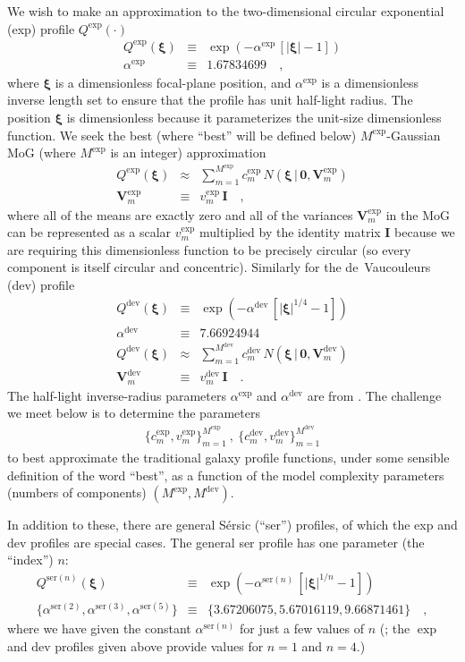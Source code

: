 \documentclass[12pt,pdftex,preprint]{aastex}
\newcommand{\tmatrix}[1]{\boldsymbol{#1}}
\newcommand{\tvector}[1]{\boldsymbol{#1}}
\newcommand{\spos}{\tvector{\xi}}
\newcommand{\var}{\tmatrix{V}}
\newcommand{\zero}{\tmatrix{0}}
\newcommand{\identity}{\tmatrix{I}}
\newcommand{\normal}{N}
\newcommand{\given}{\,|\,}
\newcommand{\dev}{\mathrm{dev}}
\newcommand{\ser}{\mathrm{ser}}
\begin{document}
We wish to make an approximation to the two-dimensional circular
exponential (exp) profile $Q^{\exp}(\cdot)$
\begin{eqnarray}\displaystyle
Q^{\exp}(\spos) &\equiv& \exp(-\alpha^{\exp}\,[|\spos| - 1])
\\
\alpha^{\exp} &\equiv& 1.67834699
\quad ,
\end{eqnarray}
where $\spos$ is a dimensionless focal-plane position, and
$\alpha^{\exp}$ is a dimensionless inverse length set to ensure that
the profile has unit half-light radius.  The position $\spos$ is
dimensionless because it parameterizes the unit-size dimensionless
function.  We seek the best (where ``best'' will be defined below)
$M^{\exp}$-Gaussian MoG (where $M^{\exp}$ is an integer) approximation
\begin{eqnarray}\displaystyle
Q^{\exp}(\spos) &\approx& \sum_{m=1}^{M^{\exp}} c^{\exp}_m\,\normal(\spos\given\zero,\var^{\exp}_m)
\\
\var^{\exp}_m &\equiv& v^{\exp}_m\,\identity
\quad ,
\end{eqnarray}
where all of the means are exactly zero and all of the variances
$\var^{\exp}_m$ in the MoG can be represented as a scalar
$v^{\exp}_m$ multiplied by the identity matrix $\identity$
because we are requiring this dimensionless function to be precisely
circular (so every component is itself circular and concentric).
Similarly for the de~Vaucouleurs (dev) profile
\begin{eqnarray}\displaystyle
Q^{\dev}(\spos) &\equiv& \exp(-\alpha^{\dev}\,[|\spos|^{1/4} - 1])
\\
\alpha^{\dev} &\equiv& 7.66924944
\\
Q^{\dev}(\spos) &\approx& \sum_{m=1}^{M^{\dev}} c^{\dev}_m\,\normal(\spos\given\zero,\var^{\dev}_m)
\\
\var^{\dev}_m &\equiv& v^{\dev}_m\,\identity
\quad .
\end{eqnarray}
The half-light inverse-radius parameters $\alpha^{\exp}$ and
$\alpha^{\dev}$ are from \citet{ciotti}.  The challenge we
meet below is to determine the parameters
\begin{eqnarray}
\{c^{\exp}_m,v^{\exp}_m\}_{m=1}^{M^{\exp}}~,~\{c^{\dev}_m,v^{\dev}_m\}_{m=1}^{M^{\dev}}
\end{eqnarray}
to best approximate the traditional galaxy profile functions, under
some sensible definition of the word ``best'', as a function of the
model complexity parameters (numbers of components) $(M^{\exp},
M^{\dev})$.

In addition to these, there are general S\'ersic (``ser'') profiles, of
which the exp and dev profiles are special cases.  The general ser
profile has one parameter (the ``index'') $n$:
\begin{eqnarray}\displaystyle
Q^{\ser(n)}(\spos) &\equiv& \exp(-\alpha^{\ser(n)}\,[|\spos|^{1/n} - 1])
\\
\{\alpha^{\ser(2)}, \alpha^{\ser(3)}, \alpha^{\ser(5)}\} &\equiv& \{3.67206075, 5.67016119, 9.66871461\}
\quad ,
\end{eqnarray}
where we have given the constant $\alpha^{\ser(n)}$ for just a few
values of $n$ (\citealt{ciotti}; the $\exp$ and $\dev$ profiles given
above provide values for $n=1$ and $n=4$.)
\end{document}
